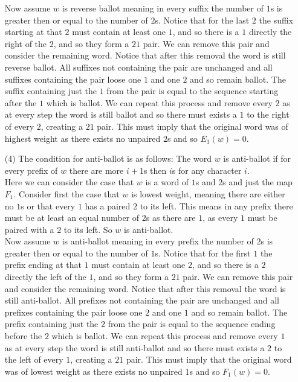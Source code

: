 \documentclass[12pt]{amsart}
\theoremstyle{definition}
\begin{document}
\begin{itemize}
Now assume $w$ is reverse ballot meaning in every suffix the number of $1$s is greater then or equal to the number of $2$s. Notice that for the last $2$ the suffix starting at that $2$ must contain at least one $1$, and so there is a $1$ directly the right of the $2$, and so they form a $21$ pair. We can remove this pair and consider the remaining word. Notice that after this removal the word is still reverse ballot. All suffixes not containing the pair are unchanged and all suffixes containing the pair loose one $1$ and one $2$ and so remain ballot. The suffix containing just the $1$ from the pair is equal to the sequence starting after the $1$ which is ballot. We can repeat this process and remove every $2$ as at every step the word is still ballot and so there must exists a $1$ to the right of every $2$, creating a $21$ pair. This must imply that the original word was of highest weight as there exists no unpaired $2$s and so $E_1(w)=0$.\\

\item[(4)] %
The condition for anti-ballot is as follows: The word $w$ is anti-ballot if for every prefix of $w$ there are more $i+1$s then $i$s for any character $i$.\\

Here we can consider the case that $w$ is a word of $1$s and $2$s and just the map $F_1$. Consider first the case that $w$ is lowest weight, meaning there are either no $1$s or that every $1$ has a paired $2$ to its left. This means in any prefix there must be at least an equal number of $2$s as there are $1$, as every $1$ must be paired with a $2$ to its left. So $w$ is anti-ballot.\\

Now assume $w$ is anti-ballot meaning in every prefix the number of $2$s is greater then or equal to the number of $1$s. Notice that for the first $1$ the prefix ending at that $1$ must contain at least one $2$, and so there is a $2$ directly the left of the $1$, and so they form a $21$ pair. We can remove this pair and consider the remaining word. Notice that after this removal the word is still anti-ballot. All prefixes not containing the pair are unchanged and all prefixes containing the pair loose one $2$ and one $1$ and so remain ballot. The prefix containing just the $2$ from the pair is equal to the sequence ending before the $2$ which is ballot. We can repeat this process and remove every $1$ as at every step the word is still anti-ballot and so there must exists a $2$ to the left of every $1$, creating a $21$ pair. This must imply that the original word was of lowest weight as there exists no unpaired $1$s and so $F_1(w)=0$.\\


\end{itemize}
\end{document}
